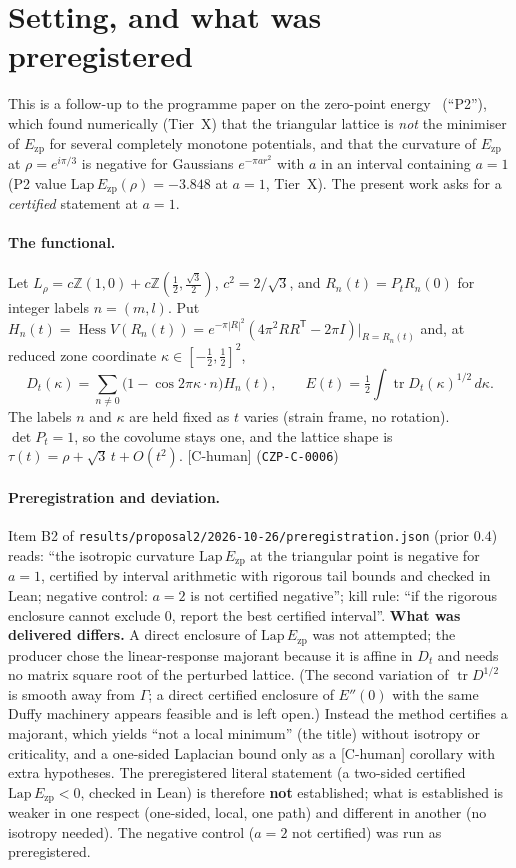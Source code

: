 \documentclass[10pt]{article}
\newcommand{\tier}[1]{\textsf{[#1]}}
\newcommand{\tCh}{\tier{C-human}}
\newcommand{\Ezp}{E_{\mathrm{zp}}}
\newcommand{\tr}{\operatorname{tr}}
\newcommand{\hess}{\operatorname{Hess}}
\begin{document}
\section{Setting, and what was preregistered}\label{sec:setting}
This is a follow-up to the programme paper on the zero-point energy~\cite{p2} (``P2''), which found numerically (Tier~X) that the triangular lattice is \emph{not} the minimiser of
$\Ezp$ for several completely monotone potentials, and that the curvature of $\Ezp$ at $\rho=e^{i\pi/3}$ is negative for Gaussians $e^{-\pi a r^2}$ with $a$ in an interval containing $a=1$
(P2 value $\mathrm{Lap}\,\Ezp(\rho)=-3.848$ at $a=1$, Tier~X). The present work asks for a \emph{certified} statement at $a=1$.

\paragraph{The functional.} Let $L_\rho=c\mathbb Z(1,0)+c\mathbb Z(\tfrac12,\tfrac{\sqrt3}2)$, $c^2=2/\sqrt3$, and $R_n(t)=P_tR_n(0)$ for integer labels $n=(m,l)$. Put
$H_n(t)=\hess V(R_n(t))=e^{-\pi|R|^2}(4\pi^2RR^{\mathsf T}-2\pi I)|_{R=R_n(t)}$ and, at reduced zone coordinate $\kappa\in[-\tfrac12,\tfrac12]^2$,
\[D_t(\kappa)=\sum_{n\ne0}\bigl(1-\cos2\pi\kappa\!\cdot\! n\bigr)H_n(t),\qquad E(t)=\tfrac12\int\tr D_t(\kappa)^{1/2}\,d\kappa .\]
The labels $n$ and $\kappa$ are held fixed as $t$ varies (strain frame, no rotation). $\det P_t=1$, so the covolume stays one, and the lattice shape is $\tau(t)=\rho+\sqrt3\,t+O(t^2)$. \tCh{} (\texttt{CZP-C-0006})

\paragraph{Preregistration and deviation.} Item B2 of \texttt{results/proposal2/2026-10-26/preregistration.json} (prior $0.4$) reads: ``the isotropic curvature $\mathrm{Lap}\,\Ezp$ at the triangular point is negative for
$a=1$, certified by interval arithmetic with rigorous tail bounds and checked in Lean; negative control: $a=2$ is not certified negative''; kill rule: ``if the rigorous enclosure cannot exclude 0, report the best certified interval''.
\textbf{What was delivered differs.} A direct enclosure of $\mathrm{Lap}\,\Ezp$ was not attempted; the producer chose the linear-response majorant because it is affine in $D_t$ and needs no matrix square root of the perturbed lattice. (The second variation of $\tr D^{1/2}$ is smooth away from $\Gamma$; a direct certified enclosure of $E''(0)$ with the same Duffy machinery appears feasible and is left open.)
Instead the method certifies a majorant, which yields ``not a local minimum'' (the title) without isotropy or criticality, and a one-sided Laplacian bound only as a \tCh{} corollary with extra hypotheses.
The preregistered literal statement (a two-sided certified $\mathrm{Lap}\,\Ezp<0$, checked in Lean) is therefore \textbf{not} established; what is established is weaker in one respect (one-sided, local, one path) and different in another (no isotropy needed). The negative control ($a=2$ not certified) was run as preregistered.
\end{document}
